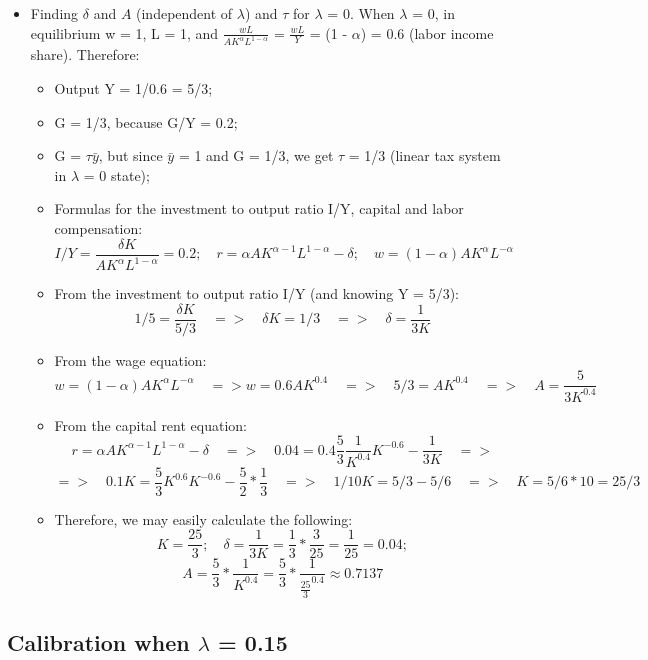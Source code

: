 \documentclass{article}
\begin{document}
\begin{itemize}
\item Finding \(\delta\) and \(A\) (independent of \(\lambda\)) and \(\tau\) for \(\lambda\) = 0. When \(\lambda\) = 0, in equilibrium w = 1, L = 1, and \(\frac{wL}{A K^{\alpha} L^{1 - \alpha}}\) = \(\frac{wL}{Y}\) = (1 - \(\alpha\)) = 0.6 (labor income share). Therefore:
\begin{itemize}
    \item Output Y = 1/0.6 = 5/3;
    \item G = 1/3, because G/Y = 0.2; 
    \item G = \(\tau\)\(\bar{y}\), but since \(\bar{y}\) = 1 and G = 1/3, we get \(\tau\) = 1/3 (linear tax system in \(\lambda\) = 0 state);
     \item Formulas for the investment to output ratio I/Y, capital and  labor compensation: 
        \[
I/Y = \frac{\delta K}{A K^{\alpha} L^{1 - \alpha}} = 0.2; \quad r = \alpha A K^{\alpha - 1} L^{1 - \alpha} - \delta; \quad w = (1 - \alpha) A K^{\alpha} L^{-\alpha}
\]
\item From the investment to output ratio I/Y (and knowing Y = 5/3):
        \[
1/5 = \frac{\delta K}{5/3} \quad=> \quad {\delta K} = 1/3 \quad => \quad {\delta }= \frac{1}{3 K}
\]

\item From the wage equation:
        \[
w = (1 - \alpha) A K^{\alpha} L^{-\alpha} \quad => w = 0.6 A K^{0.4} \quad => \quad 5/3 = A K^{0.4} \quad => \quad A=\frac{5}{3K^{0.4}}
\]


\item From the capital rent equation:
\[
r = \alpha A K^{\alpha - 1} L^{1 - \alpha} - \delta \quad => \quad 0.04 = 0.4\frac{5}{3}\frac{1}{K^{0.4}} K^{-0.6} - \frac{1}{3 K} \quad =>
\]
        \[
=> \quad 0.1K = \frac{5}{3}K^{0.6} K^{-0.6} - \frac{5}{2}*\frac{1}{3} \quad => \quad 1/10K=5/3-5/6 \quad => \quad K=5/6*10=25/3
\]

\item Therefore, we may easily calculate the following:
        \[
K=\frac{25}{3}; \quad \delta = \frac{1}{3K}=\frac{1}{3}*\frac{3}{25}=\frac{1}{25}=0.04;
\]
        \[
A = \frac{5}{3}*\frac{1}{K^{0.4}}=\frac{5}{3}*\frac{1}{\frac{25}{3}^{0.4}} \approx 0.7137
\]
\end{itemize}
\end{itemize}

\subsection*{Calibration when \(\lambda\) = 0.15}
\end{document}
